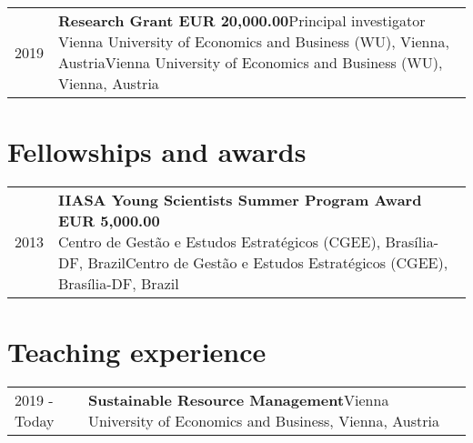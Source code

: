 \documentclass[10pt,a4paper,]{article}
\makeatletter
\def\detaileditem#1#2#3#4#5{
#2 & \parbox[t]{0.85\textwidth}{%
      \textbf{#1}\hfill{\footnotesize #3}\\
      \ifx#4\empty\else#4\par\fi%
      \ifx#5\empty\else{%
        \vspace{0.1cm}\begin{minipage}{0.7\textwidth}%
        \begin{itemize}#5\end{itemize}%
        \end{minipage}}\fi%
      \vspace{\parsep}}\\}
\def\detailedsection#1{\begin{longtable}{@{\extracolsep{\fill}}ll}#1\end{longtable}}
\makeatother
\begin{document}
\detailedsection{\detaileditem{Research Grant EUR 20,000.00}{2019}{Principal investigator}{Vienna University of Economics and Business (WU), Vienna, Austria}{\empty}\detaileditem{Educational Project Grant BRL 7,200.00}{2013}{Principal investigator}{Universidade Federal do Pampa (UNIPAMPA), Itaqui, RS, Brazil}{\empty}}

\section{Fellowships and awards}\label{fellowships-and-awards}

\detailedsection{\detaileditem{IIASA Young Scientists Summer Program Award EUR 5,000.00}{2013}{}{Centro de Gestão e Estudos Estratégicos (CGEE), Brasília-DF, Brazil}{\empty}\detaileditem{Master's Full Scholarship Award BRL 28,800.00}{2009}{}{Coordination for the Improvement of Higher Education Personnel (CAPES), Brasília-DF, Brazil}{\empty}\detaileditem{Scholarship Award BRL 6,000.00}{2008}{}{Research Support Foundation of Rio Grande do Sul (FAPERGS), Porto Alegre-RS, Brazil}{\empty}\detaileditem{Scholarship Award BRL 4,800.00}{2007}{}{Franciscan University (UFN), Santa Maria-RS, Brazil}{\empty}\detaileditem{Scholarship Award BRL 4,800.00}{2006}{}{Franciscan University (UFN), Santa Maria-RS, Brazil}{\empty}\detaileditem{Scholarship Award BRL 3,200.00}{2004}{}{Franciscan University (UFN), Santa Maria-RS, Brazil}{\empty}}

\section{Teaching experience}\label{teaching-experience}

\detailedsection{\detaileditem{Sustainable Resource Management}{2019 - Today}{Vienna University of Economics and Business, Vienna, Austria}{}{\empty}\detaileditem{Algorithms and Programming}{2013 - 2014}{Federal University of Pampa, Itaqui-RS, Brazil}{}{\empty}\detaileditem{Introduction to Informatics}{2013 - 2014}{Federal University of Pampa, Itaqui-RS, Brazil}{}{\empty}\detaileditem{Numerical Analysis}{2013 - 2014}{Federal University of Pampa, Itaqui-RS, Brazil}{}{\empty}\detaileditem{Environmental Management}{2012 - 2012}{Federal University of Pampa, Itaqui-RS, Brazil}{}{\empty}\detaileditem{Informatics}{2012 - 2013}{Federal University of Pampa, Itaqui-RS, Brazil}{}{\empty}\detaileditem{Introduction to Programming}{2012 - 2012}{Federal University of Pampa, Itaqui-RS, Brazil}{}{\empty}\detaileditem{Numerical Analysis}{2010 - 2010}{Federal University of Juiz de Fora, Juiz de Fora-MG, Brazil}{}{\empty}\detaileditem{Programming Laboratory}{2009 - 2010}{Federal University of Juiz de Fora, Juiz de Fora-MG, Brazil}{}{\empty}}
\end{document}
